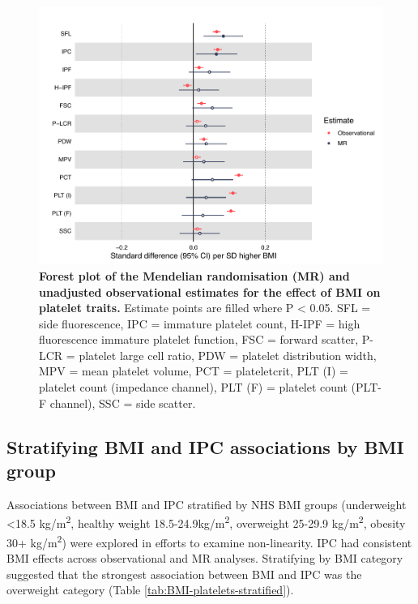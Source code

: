 \documentclass[11pt,twoside]{bristolthesis}
\begin{document}
\begin{figure}

{\centering \includegraphics[width=0.9\linewidth]{figure/BMI_platelets/BMI_platelet_forestplot} 

}

\caption[Forest plot of the Mendelian randomisation and unadjusted observational estimates for the effect of BMI on platelet traits]{\textbf{Forest plot of the Mendelian randomisation (MR) and unadjusted observational estimates for the effect of BMI on platelet traits.} Estimate points are filled where P \textless{} 0.05. SFL = side fluorescence, IPC = immature platelet count, H-IPF = high fluorescence immature platelet function, FSC = forward scatter, P-LCR = platelet large cell ratio, PDW = platelet distribution width, MPV = mean platelet volume, PCT = plateletcrit, PLT (I) = platelet count (impedance channel), PLT (F) = platelet count (PLT-F channel), SSC = side scatter.}\label{fig:BMI-platelet-forest}
\end{figure}
\hypertarget{stratifying-bmi-and-ipc-associations-by-bmi-group}{%
\subsection{Stratifying BMI and IPC associations by BMI group}\label{stratifying-bmi-and-ipc-associations-by-bmi-group}}

Associations between BMI and IPC stratified by NHS BMI groups (underweight \textless18.5 kg/m\textsuperscript{2}, healthy weight 18.5-24.9kg/m\textsuperscript{2}, overweight 25-29.9 kg/m\textsuperscript{2}, obesity 30+ kg/m\textsuperscript{2}) were explored in efforts to examine non-linearity. IPC had consistent BMI effects across observational and MR analyses. Stratifying by BMI category suggested that the strongest association between BMI and IPC was the overweight category (Table \ref{tab:BMI-platelets-stratified}).
\end{document}
